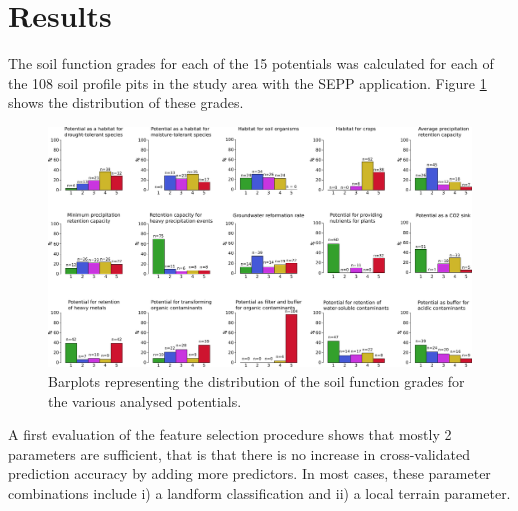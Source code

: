\documentclass[preprint,12pt,authoryear]{elsarticle}
\begin{document}
\section{Results}
The soil function grades for each of the 15 potentials was calculated for each of the 108 soil profile pits in the study area with the SEPP application. Figure \ref{fig:SFdistro} shows the distribution of these grades.
 \begin{figure}[ht!]
\includegraphics[width=\textwidth,angle=0]{soilfunctiondistro_newn.pdf}
\caption{Barplots representing the distribution of the soil function grades for the various analysed potentials. }
\label{fig:SFdistro}
\end{figure}
A first evaluation of the feature selection procedure shows that mostly 2 parameters are sufficient, that is that there is no increase in cross-validated prediction accuracy  by adding more predictors. In most cases, these parameter combinations include i) a landform classification and ii) a local terrain parameter.
\end{document}
